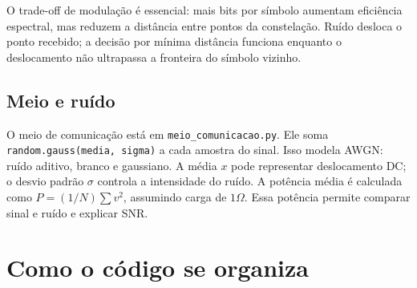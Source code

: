\documentclass[10pt,a4paper]{article}
\newcommand{\arquivo}[1]{\texttt{#1}}
\newcommand{\codigo}[1]{\texttt{#1}}
\begin{document}
O trade-off de modulação é essencial: mais bits por símbolo aumentam eficiência espectral, mas reduzem a distância entre pontos da constelação. Ruído desloca o ponto recebido; a decisão por mínima distância funciona enquanto o deslocamento não ultrapassa a fronteira do símbolo vizinho.

\subsection{Meio e ruído}

O meio de comunicação está em \arquivo{meio\_comunicacao.py}. Ele soma \codigo{random.gauss(media, sigma)} a cada amostra do sinal. Isso modela AWGN: ruído aditivo, branco e gaussiano. A média \(x\) pode representar deslocamento DC; o desvio padrão \(\sigma\) controla a intensidade do ruído. A potência média é calculada como \(P=(1/N)\sum v^2\), assumindo carga de \(1\Omega\). Essa potência permite comparar sinal e ruído e explicar SNR.

\section{Como o código se organiza}
\end{document}
